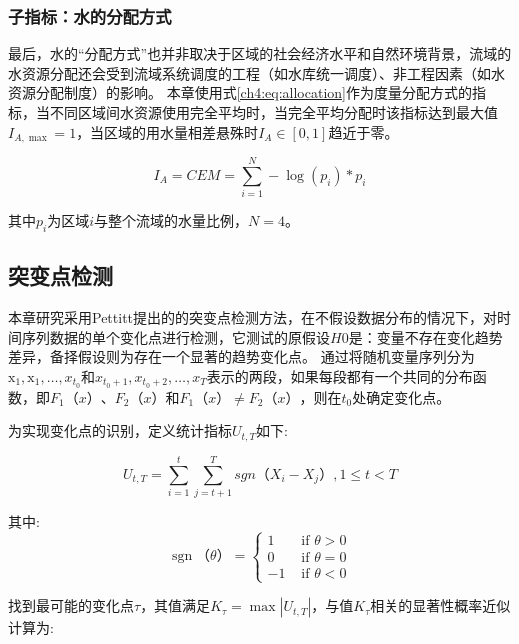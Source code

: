 \subsubsection{子指标：水的分配方式}

最后，水的“分配方式”也并非取决于区域的社会经济水平和自然环境背景，流域的水资源分配还会受到流域系统调度的工程（如水库统一调度）、非工程因素（如水资源分配制度）的影响\cite{schmandt2021,speed2013}。
本章使用式\ref{ch4:eq:allocation}作为度量分配方式的指标，当不同区域间水资源使用完全平均时，当完全平均分配时该指标达到最大值$I_{A, \max} = 1$，当区域的用水量相差悬殊时$I_A \in [0, 1]$趋近于零。

\begin{equation}
    I_A = CEM = \sum_{i=1}^N - \log(p_{i}) * p_{i}
    \label{ch4:eq:allocation}
\end{equation}

其中$p_{i}$为区域$i$与整个流域的水量比例，$N=4$。

\subsection{突变点检测}

本章研究采用Pettitt提出的的突变点检测方法，在不假设数据分布的情况下，对时间序列数据的单个变化点进行检测\cite{pettitt1979}，它测试的原假设$H0$是：变量不存在变化趋势差异，备择假设则为存在一个显著的趋势变化点。
通过将随机变量序列分为$\mathrm{x}_{1}, \mathrm{x}_{1}, \ldots, x_{t_{0}}$和$x_{t_{0}+1}, x_{t_{0}+2}, \ldots, x_{T}$表示的两段，如果每段都有一个共同的分布函数，即$F_1（x）$、$F_2（x）$和$F_1（x） \neq F_2（x）$，则在$t_0$处确定变化点。

为实现变化点的识别，定义统计指标$U_{t,T}$如下:

\begin{equation}
    U_{t, T} = \sum_{i=1}^t\sum_{j=t+1}^T sgn（X_i - X_j）, 1 \leq t < T
\end{equation}

其中:
\begin{equation}
    \operatorname{sgn}（\theta）= \begin{cases}1 & \text { if } \theta>0 \\ 0 & \text { if } \theta=0 \\ -1 & \text { if } \theta<0\end{cases}
\end{equation}

找到最可能的变化点$\tau$，其值满足$K_{\tau} = \max|U_{t, T}|$，与值$K_{\tau}$相关的显著性概率近似计算为:

